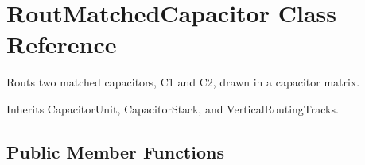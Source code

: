 \hypertarget{classpython_1_1CapacitorRouted_1_1RoutMatchedCapacitor}{\section{Rout\-Matched\-Capacitor Class Reference}
\label{classpython_1_1CapacitorRouted_1_1RoutMatchedCapacitor}
}


Routs two matched capacitors, C1 and C2, drawn in a capacitor matrix.  




Inherits Capacitor\-Unit, Capacitor\-Stack, and Vertical\-Routing\-Tracks.

\subsection*{Public Member Functions}
